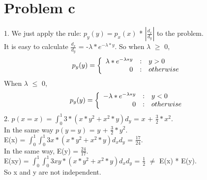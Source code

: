 \documentclass[twoside,11pt]{homework}
\begin{document}
\maketitle

\section*{Problem c}
1. We just apply the rule: $p_{y}(y) = p_{x}(x)$ * $|\frac{d_{x}}{d_{y}}|$ to the problem. \\
It is easy to calculate $\frac{d_{x}}{d_{y}}$ = -$\lambda * e^{-\lambda * y}$.
So when $\lambda$ $\ge$ 0,  \\
\begin{equation} 
p_{y}(y) = 
\left\{ 
\begin{array} 
    {r@{\quad:\quad}l} 
    \lambda * e^{-\lambda * y} & y > 0 \\ 
    0  &  otherwise
\end{array} 
\right. 
\end{equation}	
When $\lambda$ $\le$ 0, \\
\begin{equation} 
p_{y}(y) = 
\left\{ 
\begin{array} 
    {r@{\quad:\quad}l} 
    -\lambda * e^{-\lambda * y} & y < 0 \\ 
    0  &  otherwise
\end{array} 
\right. 
\end{equation}	
2. $p(x = x)$ = $\int_{0}^{1} 3*(x*y^{2} + x^{2} * y) d_{y}$ = $x$ + $\frac{3}{2} * x^{2}$. \\
In the same way $p(y = y)$ =  $y$ + $\frac{3}{2} * y^{2}$. \\
E(x) =  $\int_{0}^{1} \int_{0}^{1} 3x *(x*y^{2} + x^{2} * y) d_{x}d_{y}$ = $\frac{17}{24}$. \\
In the same way, E(y) =  $\frac{24}{17}$. \\
E(xy) = $\int_{0}^{1} \int_{0}^{1} 3xy *(x*y^{2} + x^{2} * y) d_{x}d_{y}$ = $\frac{1}{2}$ $\neq$ E(x) * E(y). \\
So x and y are not independent.
\end{document}
